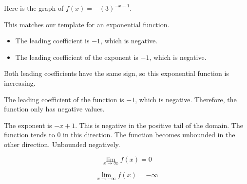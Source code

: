 \documentclass{ximera}
\begin{document}
\begin{example}



Here is the graph of $f(x) = -\left( 3 \right)^{-x + 1}$.

\begin{image}
\end{image}



This matches our template for an exponential function. 


\begin{itemize}
  \item The leading coefficient is $-1$, which is negative. 
  \item The leading coefficient of the exponent is $-1$, which is negative. 
\end{itemize}

Both leading coefficients have the same sign, so this exponential function is increasing. 



The leading coefficient of the function is $-1$, which is negative. Therefore, the function only has negative values. 


The exponent is $-x+1$.  This is negative in the positive tail of the domain. The function tends to $0$ in this direction. The function becomes unbounded in the other direction. Unbounded negatively. 




\[
\lim\limits_{x \to \infty} f(x) = 0 
\]


\[
\lim\limits_{x \to -\infty} f(x) = -\infty 
\]

\end{example}
\end{document}
